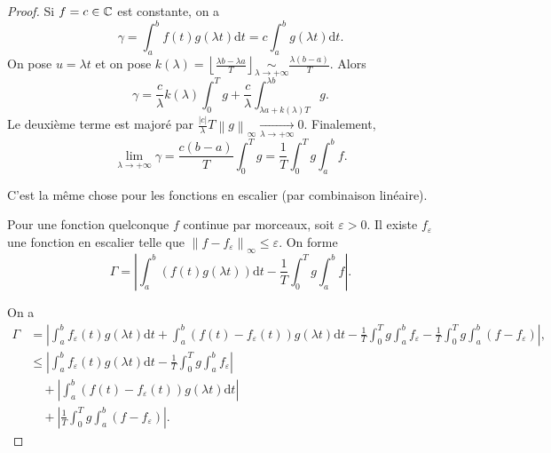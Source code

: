 \documentclass[12pt]{article}
\begin{document}
\begin{proof}
    Si $f=c\in\mathbb{C}$ est constante, on a 
    \begin{equation*}
        \gamma=\int_{a}^{b}f(t)g(\lambda t)\mathrm{d}t=c\int_{a}^{b}g(\lambda t)\mathrm{d}t.
    \end{equation*}
    On pose $u=\lambda t$ et on pose $k(\lambda)=\left\lfloor\frac{\lambda b-\lambda a}{T}\right\rfloor\underset{\lambda\to+\infty}{\sim}\frac{\lambda(b-a)}{T}$. Alors 
    \begin{equation*}
        \gamma=\frac{c}{\lambda}k(\lambda)\int_{0}^{T}g+\frac{c}{\lambda}\int_{\lambda a+k(\lambda)T}^{\lambda b}g.
    \end{equation*}
    Le deuxième terme est majoré par $\frac{\left\lvert c\right\rvert}{\lambda}T\left\lVert g\right\rVert_{\infty}\xrightarrow[\lambda\to+\infty]{}0$. Finalement,
    \begin{equation*}
        \lim\limits_{\lambda\to+\infty}\gamma=\frac{c(b-a)}{T}\int_{0}^{T}g=\frac{1}{T}\int_{0}^{T}g\int_{a}^{b}f.
    \end{equation*}

    C'est la même chose pour les fonctions en escalier (par combinaison linéaire).

    Pour une fonction quelconque $f$ continue par morceaux, soit $\varepsilon>0$. Il existe $f_{\varepsilon}$ une fonction en escalier telle que $\left\lVert f-f_{\varepsilon}\right\rVert_{\infty}\leqslant\varepsilon$. On forme 
    \begin{equation*}
        \Gamma=\left\lvert\int_{a}^{b}(f(t)g(\lambda t))\mathrm{d}t-\frac{1}{T}\int_{0}^{T}g\int_{a}^{b}f\right\rvert.
    \end{equation*}

    On a 
    \begin{align*}
        \Gamma
        &=\left\lvert \int_{a}^{b}f_{\varepsilon}(t)g(\lambda t)\mathrm{d}t+\int_{a}^{b}(f(t)-f_{\varepsilon}(t))g(\lambda t)\mathrm{d}t-\frac{1}{T}\int_{0}^{T}g\int_{a}^{b}f_{\varepsilon}-\frac{1}{T}\int_{0}^{T}g\int_{a}^{b}(f-f_{\varepsilon})\right\rvert,\\
        &\leqslant \left\lvert \int_{a}^{b}f_{\varepsilon}(t)g(\lambda t)\mathrm{d}t-\frac{1}{T}\int_{0}^{T}g\int_{a}^{b}f_{\varepsilon}\right\rvert\\
        &\quad
        +\left\lvert \int_{a}^{b}(f(t)-f_{\varepsilon}(t))g(\lambda t)\mathrm{d}t\right\rvert\\
        &\quad
        +\left\lvert\frac{1}{T}\int_{0}^{T}g\int_{a}^{b}(f-f_{\varepsilon})\right\rvert.
    \end{align*}


\end{proof}
\end{document}
